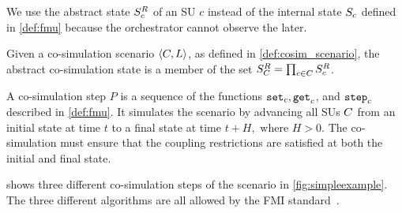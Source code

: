 We use the abstract state $S^{R}_{c}$ of an SU $c$ instead of the internal state $S_{c}$ defined in \cref{def:fmu} because the orchestrator cannot observe the later.

\begin{definition}\label{def:cosimstate}
  Given a co-simulation scenario $ \left\langle C, L \right\rangle $, as defined in \cref{def:cosim_scenario}, the abstract co-simulation state is a member of the set $S^{R}_{C} = \prod_{c \in C} S^{R}_{c}$. 
\end{definition}

A co-simulation step $P$ is a sequence of the functions $\mathtt{set}_{c},\mathtt{get}_{c}$, and $\mathtt{step}_{c}$ described in \cref{def:fmu}.
It simulates the scenario by advancing all SUs $C$ from an initial state at time $t$ to a final state at time $t+H, \textrm{ where } H > 0$.
The co-simulation must ensure that the coupling restrictions are satisfied at both the initial and final state.

 shows three different co-simulation steps of the scenario in \cref{fig:simpleexample}.
The three different algorithms are all allowed by the FMI standard~\cite{FMI2014}. 

